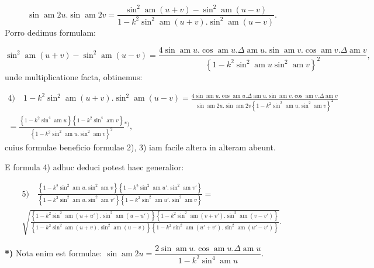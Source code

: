 \documentclass{article}
\begin{document}
\[
\sin\operatorname{am}2u.\sin\operatorname{am}2v=\frac{\sin^{2}\operatorname{am}(u+v)-\sin^{2}\operatorname{am}(u-v)}{1-k^{2}\sin^{2}\operatorname{am}(u+v).\sin^{2}\operatorname{am}(u-v)}.
\]
Porro dedimus formulam:

\[
\sin^{2}\operatorname{am}(u+v)-\sin^{2}\operatorname{am}(u-v)=\frac{4\sin\operatorname{am}u.\cos\operatorname{am}u.\Delta\operatorname{am}u.\sin\operatorname{am}v.\cos\operatorname{am}v.\Delta\operatorname{am}v}{\left\{1-k^{2}\sin^{2}\operatorname{am}u\sin^{2}\operatorname{am}v\right\}^{2}},
\]
unde multiplicatione facta, obtinemus:

\[
\begin{gathered}
\text{4)}\quad 1-k^{2}\sin^{2}\operatorname{am}(u+v).\sin^{2}\operatorname{am}(u-v)=\frac{4\sin\operatorname{am}u.\cos\operatorname{am}u.\Delta\operatorname{am}u.\sin\operatorname{am}v.\cos\operatorname{am}v.\Delta\operatorname{am}v}{\sin\operatorname{am}2u.\sin\operatorname{am}2v\left\{1-k^{2}\sin^{2}\operatorname{am}u.\sin^{2}\operatorname{am}v\right\}^{2}}\\[1.5ex]
=\frac{\left\{1-k^{2}\sin^{4}\operatorname{am}u\right\}\left\{1-k^{2}\sin^{4}\operatorname{am}v\right\}}{\left\{1-k^{2}\sin^{2}\operatorname{am}u.\sin^{2}\operatorname{am}v\right\}^{2}}{}^{*)},
\end{gathered}
\]
cuius formulae beneficio formulae 2), 3) iam facile altera in alteram abeunt.

E formula 4) adhuc deduci potest haec generalior:

\[
\begin{gathered}
\text{5)}\quad \frac{\left\{1-k^{2}\sin^{2}\operatorname{am}u.\sin^{2}\operatorname{am}v\right\}\left\{1-k^{2}\sin^{2}\operatorname{am}u'.\sin^{2}\operatorname{am}v'\right\}}{\left\{1-k^{2}\sin^{2}\operatorname{am}u.\sin^{2}\operatorname{am}v'\right\}\left\{1-k^{2}\sin^{2}\operatorname{am}u'.\sin^{2}\operatorname{am}v\right\}}=\\[1.5ex]
\sqrt{\frac{\left\{1-k^{2}\sin^{2}\operatorname{am}(u+u').\sin^{2}\operatorname{am}(u-u')\right\}\left\{1-k^{2}\sin^{2}\operatorname{am}(v+v').\sin^{2}\operatorname{am}(v-v')\right\}}{\left\{1-k^{2}\sin^{2}\operatorname{am}(u+v).\sin^{2}\operatorname{am}(u-v)\right\}\left\{1-k^{2}\sin^{2}\operatorname{am}(u'+v').\sin^{2}\operatorname{am}(u'-v')\right\}}}.
\end{gathered}
\]

\textbf{*)} Nota enim est formulae: $\sin\operatorname{am}2u=\dfrac{2\sin\operatorname{am}u.\cos\operatorname{am}u.\Delta\operatorname{am}u}{1-k^{2}\sin^{4}\operatorname{am}u}$.
\end{document}
